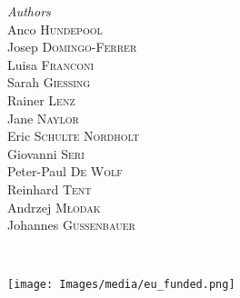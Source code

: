 	\begin{minipage}{0.4\textwidth}
		\begin{flushleft}
			\large
			\textit{Authors}\\
			Anco \textsc{Hundepool}\\
    		Josep \textsc{Domingo-Ferrer}\\
    		Luisa \textsc{Franconi}\\
    		Sarah \textsc{Giessing}\\
    		Rainer \textsc{Lenz}\\
    		Jane \textsc{Naylor}\\
    		Eric \textsc{Schulte Nordholt}\\
    		Giovanni \textsc{Seri}\\
    		Peter-Paul \textsc{De Wolf}\\
    		Reinhard \textsc{Tent}\\
    		Andrzej \textsc{Młodak}\\
    		Johannes \textsc{Gussenbauer}
		\end{flushleft}
	\end{minipage}
	~
	\begin{minipage}{0.4\textwidth}
		\begin{flushright}
			\large
		\end{flushright}
	\end{minipage}
	
	
	
	\vfill\vfill\vfill %
	
	
	\vfill\vfill
	\texttt{[image: Images/media/eu\_funded.png]}\\[1cm] %
	 
	
